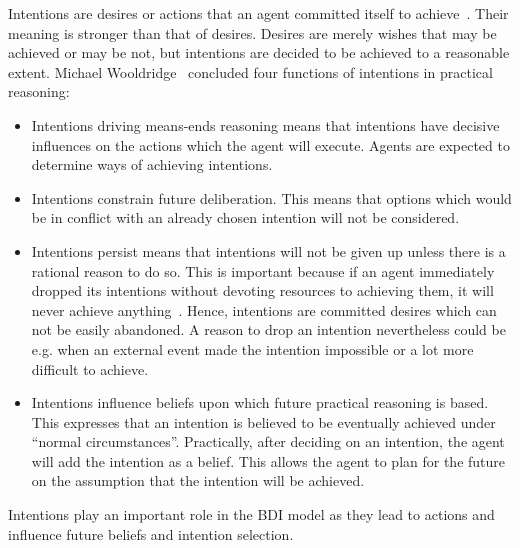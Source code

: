 Intentions are desires or actions that an agent committed itself to achieve~\cite{Alejandro_LearnBDI_2004}.
Their meaning is stronger than that of desires.
Desires are merely wishes that may be achieved or may be not, but intentions are decided to be achieved to a reasonable extent.
Michael Wooldridge~\cite{Gerhard_MultiSystem_1999} concluded four functions of intentions in practical reasoning:
\begin{itemize}
  \item Intentions driving means-ends reasoning means that intentions have decisive influences on the actions which the agent will execute.
    Agents are expected to determine ways of achieving intentions.
  \item Intentions constrain future deliberation.
    This means that options which would be in conflict with an already chosen intention will not be considered.
  \item Intentions persist means that intentions will not be given up unless there is a rational reason to do so.
    This is important because if an agent immediately dropped its intentions without devoting resources to achieving them, it will never achieve anything~\cite{Gerhard_MultiSystem_1999}.
    Hence, intentions are committed desires which can not be easily abandoned.
    A reason to drop an intention nevertheless could be e.g. when an external event made the intention impossible or a lot more difficult to achieve.
  \item Intentions influence beliefs upon which future practical reasoning is based.
    This expresses that an intention is believed to be eventually achieved under \enquote{normal circumstances}.
    Practically, after deciding on an intention, the agent will add the intention as a belief.
    This allows the agent to plan for the future on the assumption that the intention will be achieved.
\end{itemize}
Intentions play an important role in the BDI model as they lead to actions and influence future beliefs and intention selection.

